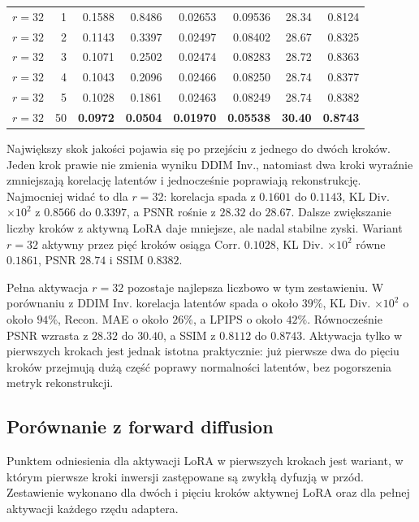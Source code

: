 \documentclass[
    left=2.5cm,
    right=2.5cm,
    top=2.5cm,
    bottom=3cm,
    bindingoffset=6mm,
    nohyphenation=false
]{szablon/eiti/sprawozdanie}
\begin{document}
\begin{table}[H]
{\begin{tabular}{lrrrrrrr}
        \midrule
        $r=32$ & 1  & 0.1588 & 0.8486 & 0.02653 & 0.09536 & 28.34 & 0.8124 \\
        $r=32$ & 2  & 0.1143 & 0.3397 & 0.02497 & 0.08402 & 28.67 & 0.8325 \\
        $r=32$ & 3  & 0.1071 & 0.2502 & 0.02474 & 0.08283 & 28.72 & 0.8363 \\
        $r=32$ & 4  & 0.1043 & 0.2096 & 0.02466 & 0.08250 & 28.74 & 0.8377 \\
        $r=32$ & 5  & 0.1028 & 0.1861 & 0.02463 & 0.08249 & 28.74 & 0.8382 \\
        $r=32$ & 50 & \textbf{0.0972} & \textbf{0.0504} & \textbf{0.01970} & \textbf{0.05538} & \textbf{30.40} & \textbf{0.8743} \\
        \bottomrule
    \end{tabular}}
\end{table}

Największy skok jakości pojawia się po przejściu z jednego do dwóch kroków.
Jeden krok prawie nie zmienia wyniku DDIM Inv., natomiast dwa kroki wyraźnie
zmniejszają korelację latentów i jednocześnie poprawiają rekonstrukcję.
Najmocniej widać to dla $r=32$: korelacja spada z $0.1601$ do $0.1143$, KL
Div. $\times 10^2$ z $0.8566$ do $0.3397$, a PSNR rośnie z $28.32$ do
$28.67$. Dalsze zwiększanie liczby kroków z aktywną LoRA daje mniejsze,
ale nadal stabilne zyski.
Wariant $r=32$ aktywny przez pięć kroków osiąga Corr. $0.1028$, KL Div.
$\times 10^2$ równe $0.1861$, PSNR $28.74$ i SSIM $0.8382$.

Pełna aktywacja $r=32$ pozostaje najlepsza liczbowo w tym zestawieniu.
W porównaniu z DDIM Inv. korelacja latentów spada o około $39\%$, KL Div.
$\times 10^2$ o około $94\%$, Recon. MAE o około $26\%$, a LPIPS o około
$42\%$. Równocześnie PSNR wzrasta z $28.32$ do $30.40$, a SSIM z $0.8112$
do $0.8743$. Aktywacja tylko w pierwszych krokach jest jednak istotna
praktycznie: już pierwsze dwa do pięciu kroków przejmują dużą część poprawy
normalności latentów, bez pogorszenia metryk rekonstrukcji.

\subsection{Porównanie z forward diffusion}

Punktem odniesienia dla aktywacji LoRA w pierwszych krokach jest wariant,
w którym pierwsze kroki inwersji zastępowane są zwykłą dyfuzją w przód.
Zestawienie wykonano dla dwóch i pięciu kroków aktywnej LoRA oraz dla
pełnej aktywacji każdego rzędu adaptera.
\end{document}

